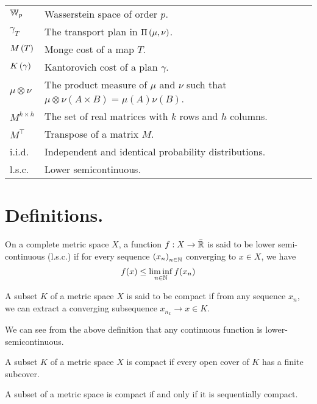 \begin{tabular}{ l l }
	$\mathbb{W}_{p}$ & Wasserstein space of order $p$.\\
 	$\gamma_T$ & The transport plan in $\Pi\left(\mu, \nu\right)$.\\
	$M\left(T\right)$ & Monge cost of a map $T$. \\
	$K\left(\gamma\right)$ & Kantorovich cost of a plan $\gamma$. \\	
	$\mu \otimes \nu$ & The product measure of $\mu$ and $\nu$ such that $\mu \otimes \nu (A\times B)= \mu(A)\nu(B)$.\\
	$M^{k\times h}$ & The set of real matrices with $k$ rows and $h$ columns. \\
	$M^\top$ & Transpose of a matrix $M$. \\
	i.i.d. & Independent and identical probability distributions.\\
	l.s.c. & Lower semicontinuous.
\end{tabular}



\section{Definitions.}
\begin{definition}
	On a complete metric space $X$, a function $f: X\rightarrow\bar{\mathbb{R}}$ is said to be lower semi-continuous (l.s.c.) if for every sequence $\left( x_n \right)_{n\in\mathbb{N}}$ converging to $x\in X$, we have \begin{equation*}
		f(x)\leq \liminf_{n\in \mathbb{N}} f(x_n)
	\end{equation*}
\end{definition}

\begin{definition}
	A subset $K$ of a metric space $X$ is said to be compact if from any sequence $x_n$, we can extract a converging subsequence $x_{n_k} \rightarrow x \in K$.
\end{definition}
We can see from the above definition that any continuous function is lower-semicontinuous. 

\begin{definition}[Compactness.]
		A subset $K$ of a metric space $X$ is compact if every open cover of $K$ has a finite subcover. 
\end{definition}

\begin{theorem}
	A subset of a metric space is compact if and only if it is sequentially compact.
\end{theorem}

